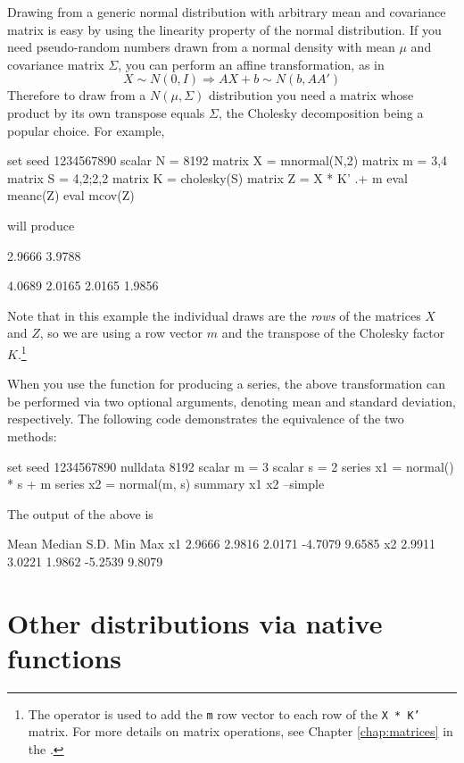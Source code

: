 Drawing from a generic normal distribution with arbitrary mean and
covariance matrix is easy by using the linearity property of the
normal distribution. If you need pseudo-random numbers drawn from a
normal density with mean $\mu$ and covariance matrix $\Sigma$, you can
perform an affine transformation, as in
\[
  X \sim N(0, I) \Longrightarrow AX + b  \sim N(b, AA')
\]
Therefore to draw from a $N(\mu, \Sigma)$ distribution you need a
matrix whose product by its own transpose equals $\Sigma$, the
Cholesky decomposition being a popular choice. For example,
\begin{code}
  set seed 1234567890
  scalar N = 8192
  matrix X = mnormal(N,2)
  matrix m = {3,4}
  matrix S = {4,2;2,2}
  matrix K = cholesky(S)
  matrix Z = X * K' .+ m
  eval meanc(Z)
  eval mcov(Z)
\end{code}
will produce
\begin{code}
      2.9666       3.9788 

      4.0689       2.0165 
      2.0165       1.9856 
\end{code}
Note that in this example the individual draws are the \emph{rows} of
the matrices $X$ and $Z$, so we are using a row vector $m$ and the
transpose of the Cholesky factor $K$.\footnote{The  operator
  is used to add the \texttt{m} row vector to each row of the
  \texttt{X * K'} matrix.  For more details on matrix operations, see
  Chapter \ref{chap:matrices} in the \GUG.}

When you use the  function for producing a series, the
above transformation can be performed via two optional arguments,
denoting mean and standard deviation, respectively. The following code
demonstrates the equivalence of the two methods:
\begin{code}
set seed 1234567890
nulldata 8192
scalar m = 3
scalar s = 2
series x1 = normal() * s + m
series x2 = normal(m, s)
summary x1 x2 --simple
\end{code}
The output of the above is
\begin{code}
           Mean      Median        S.D.         Min         Max
x1       2.9666      2.9816      2.0171     -4.7079      9.6585
x2       2.9911      3.0221      1.9862     -5.2539      9.8079
\end{code}

\section{Other distributions via native functions}
\label{sec:randgen-other-native}

